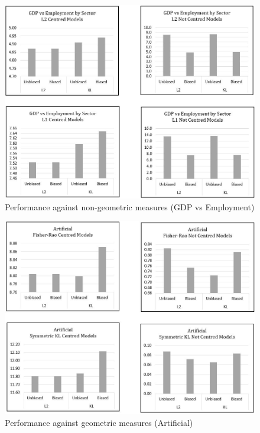 \documentclass[BSc]{usydthesis}
\numberwithin{equation}{chapter}
\theoremstyle{remark}
\begin{document}
\begin{figure}
 \centering
 \includegraphics[scale=0.6,keepaspectratio=true]{graphs/G-GDP2.JPG}
 \caption{Performance against non-geometric measures (GDP vs Employment)}
\end{figure}
\newpage

\begin{figure}
 \centering
 \includegraphics[scale=0.6,keepaspectratio=true]{graphs/G-Arti1.JPG}
 \caption{Performance against geometric measures (Artificial)}
\end{figure}
\end{document}
